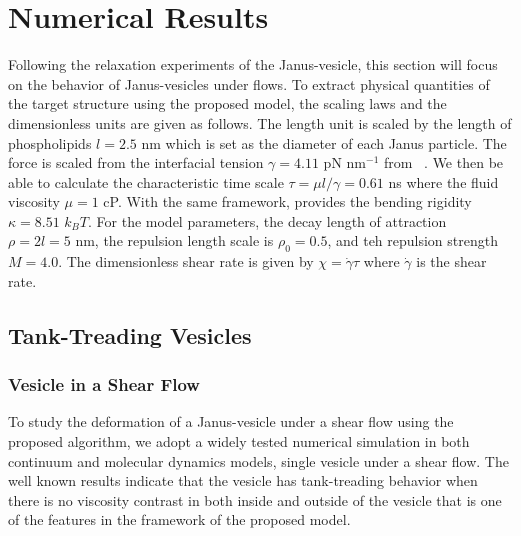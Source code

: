 \documentclass[lineno]{jfm}
\begin{document}
\section{\label{results}Numerical Results}


Following the relaxation experiments of the Janus-vesicle, this section will focus on the behavior of 
Janus-vesicles under flows. To extract physical quantities of the target structure using the proposed model, 
the scaling laws and the dimensionless units are given as follows.
The length unit is scaled by the length of phospholipids $l=2.5$ nm which is set as the diameter of each 
Janus particle. The force is scaled from the interfacial tension $\gamma=4.11$ pN nm$^{-1}$ 
from ~\cite{Ryham16}. We then be able to calculate the characteristic time scale 
$\tau = \mu l/\gamma = 0.61$ ns where the fluid viscosity $\mu=1$ cP. With the same framework, \cite{Fu20} provides the bending rigidity $\kappa=8.51$ $k_BT$.
%
For the model parameters, the decay length of attraction $\rho = 2l = 5$ nm, the repulsion length scale is 
$\rho_0=0.5$, and teh repulsion strength $M=4.0$.
The dimensionless shear rate is given by $\chi = \dot\gamma \tau$ where $\dot\gamma$ is the shear rate.





\subsection{Tank-Treading Vesicles}

\subsubsection{Vesicle in a Shear Flow}

To study the deformation of a Janus-vesicle under a shear flow using the proposed algorithm, 
we adopt a widely tested numerical simulation in both continuum and molecular dynamics models, single vesicle under a shear flow. The well known results indicate that the vesicle has tank-treading behavior when 
there is no viscosity contrast in both inside and outside of the vesicle that is one of the features in the  framework of the proposed model. 
\end{document}
